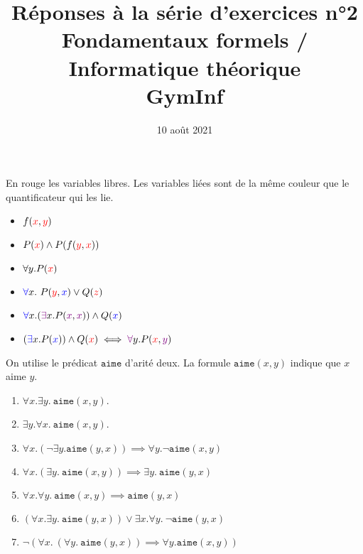 \documentclass[12pt,french,a4paper]{article}
\begin{document}
\title{\vspace{-2cm}Réponses à la série d'exercices n°2\\\large{Fondamentaux formels / Informatique théorique\\GymInf}}
\date{\vspace{-1cm}10 août 2021}

\maketitle

\begin{question}
En rouge les variables libres. Les variables liées sont de la même couleur que le quantificateur qui les lie.

\begin{itemize}
\item $f(\textcolor{red}{x}, \textcolor{red}{y})$
\item $P(\textcolor{red}{x}) \wedge P(f(\textcolor{red}{y}, \textcolor{red}{x}))$
\item $\forall y. P(\textcolor{red}{x})$
\item $\textcolor{blue}{\forall} x.\ P(\textcolor{red}{y}, \textcolor{blue}{x}) \vee Q(\textcolor{red}{z})$
\item $\textcolor{blue}{\forall} x. (\textcolor{violet}{\exists} x. P(\textcolor{violet}{x}, \textcolor{violet}{x})) \wedge Q(\textcolor{blue}{x})$
\item $(\textcolor{blue}{\exists} x. P(\textcolor{blue}{x})) \wedge Q(\textcolor{red}{x}) \iff \textcolor{violet}{\forall} y. P(\textcolor{red}{x}, \textcolor{violet}{y})$
\end{itemize}
\end{question}


\begin{question}
On utilise le prédicat $\texttt{aime}$ d'arité deux. La formule $\texttt{aime}(x, y)$ indique que $x$ aime $y$.
\begin{enumerate}
\item $\forall x. \exists y.\ \texttt{aime}(x, y)$.
\item $\exists y. \forall x.\ \texttt{aime}(x, y)$.
\item $\forall x. (\neg \exists y. \texttt{aime}(y, x)) \implies \forall y. \neg \texttt{aime}(x, y)$
\item $\forall x. (\exists y.\ \texttt{aime}(x, y)) \implies \exists y.\ \texttt{aime}(y, x)$
\item $\forall x. \forall y.\ \texttt{aime}(x, y) \implies \texttt{aime}(y, x)$
\item $(\forall x. \exists y.\ \texttt{aime}(y, x)) \vee \exists x. \forall y.\ \neg \texttt{aime}(y, x)$
\item $\neg (\forall x.\ (\forall y.\ \texttt{aime}(y, x)) \implies \forall y. \texttt{aime}(x, y))$
\end{enumerate}
\end{question}
\end{document}
